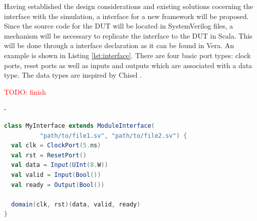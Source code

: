 \documentclass[11pt,a4paper]{report}
\newcommand{\todo}[1]{\textcolor{red}{TODO: #1}}
\begin{document}
Having established the design considerations and existing solutions cocerning the interface with the simulation, a
interface for a new framework will be proposed. Since the source code for the DUT will be located in SystemVerilog
files, a mechanism will be necessary to replicate the interface to the DUT in Scala. This will be done through a
interface declaration as it can be found in Vera. An example is shown in Listing \ref{lst:interface}. There are four
basic port types: clock ports, reset ports as well as inputs and outputs which are associated with a data type. The
data types are inspired by Chisel \cite{chiselpaper}.

\todo{finish}

- 

\begin{listing}
\begin{lstlisting}[language=scala, captionpos=b, caption=Example for an interface declaration in Scala. Each data signal is assocaited with a clock domain.,label=lst:interface]
class MyInterface extends ModuleInterface(
          "path/to/file1.sv", "path/to/file2.sv") {
  val clk = ClockPort(5.ns)
  val rst = ResetPort()
  val data = Input(UInt(8.W))
  val valid = Input(Bool())
  val ready = Output(Bool())

  domain(clk, rst)(data, valid, ready)
}
\end{lstlisting}
\end{listing}
\end{document}
